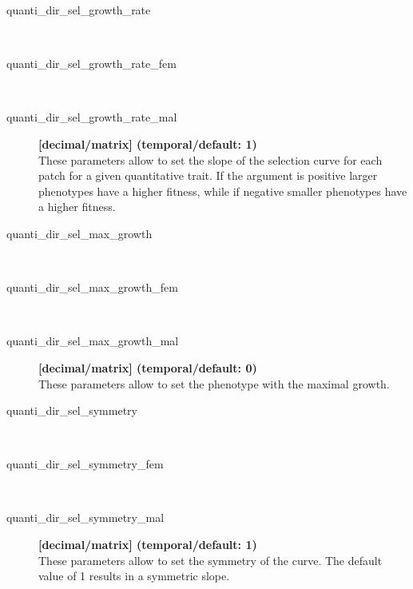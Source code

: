 \documentclass[letterpaper,12pt,oneside]{book}
\begin{document}
\begin{description}
\item[quanti\_dir\_sel\_growth\_rate]\hspace*{\fill}\\
\vspace{-9mm}
\item[quanti\_dir\_sel\_growth\_rate\_fem]\hspace*{\fill}\\
\vspace{-9mm}
\item[quanti\_dir\_sel\_growth\_rate\_mal]\textbf{[decimal/matrix] (temporal/default: 1)}\\
These parameters allow to set the slope of the selection curve for each patch for a given quantitative trait. If the argument is positive larger phenotypes have a higher fitness, while if negative smaller phenotypes have a higher fitness. 

\item[quanti\_dir\_sel\_max\_growth]\hspace*{\fill}\\
\vspace{-9mm}
\item[quanti\_dir\_sel\_max\_growth\_fem]\hspace*{\fill}\\
\vspace{-9mm}
\item[quanti\_dir\_sel\_max\_growth\_mal]\textbf{[decimal/matrix] (temporal/default: 0)}\\
These parameters allow to set the phenotype with the maximal growth.

\item[quanti\_dir\_sel\_symmetry]\hspace*{\fill}\\
\vspace{-9mm}
\item[quanti\_dir\_sel\_symmetry\_fem]\hspace*{\fill}\\
\vspace{-9mm}
\item[quanti\_dir\_sel\_symmetry\_mal]\textbf{[decimal/matrix] (temporal/default: 1)}\\
These parameters allow to set the symmetry of the curve. The default value of 1 results in a symmetric slope. 


\end{description}
\end{document}
